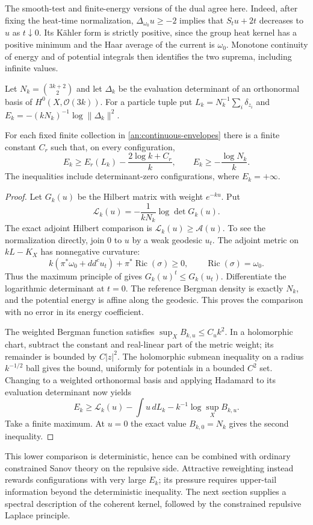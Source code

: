 The smooth-test and finite-energy versions of the dual agree here.
Indeed, after fixing the heat-time normalization,
$\Delta_{\omega_0}u\ge-2$ implies that $S_tu+2t$ decreases to $u$ as
$t\downarrow0$. Its K\"ahler form is strictly positive, since the group
heat kernel has a positive minimum and the Haar average of the current
is $\omega_0$. Monotone continuity of energy and of potential integrals
then identifies the two suprema, including infinite values.

Let $N_k=\binom{3k+2}{2}$ and let $\Delta_k$ be the evaluation
determinant of an orthonormal basis of $H^0(X,\mathcal O(3k))$.
For a particle tuple put $L_k=N_k^{-1}\sum_i\delta_{z_i}$ and
$E_k=-(kN_k)^{-1}\log\|\Delta_k\|^2$.

\begin{theorem}
\label{an:lower-comparison}
For each fixed finite collection in \eqref{an:continuous-envelopes}
there is a finite constant $C_r$ such that, on every configuration,
\begin{equation}
 E_k\ge E_r(L_k)-\frac{2\log k+C_r}{k},
 \qquad E_k\ge-\frac{\log N_k}{k}.
 \label{an:LC}
\end{equation}
The inequalities include determinant-zero configurations, where
$E_k=+\infty$.
\end{theorem}

\begin{proof}
Let $G_k(u)$ be the Hilbert matrix with weight $e^{-ku}$. Put
\[
 \mathcal L_k(u)=-\frac{1}{kN_k}\log\det G_k(u).
\]
The exact adjoint
Hilbert comparison is
$\mathcal L_k(u)\ge\mathcal A(u)$. To see the normalization directly,
join $0$ to $u$ by a weak geodesic $u_t$. The adjoint metric on
$kL-K_X$ has nonnegative curvature:
\[
 k(\pi^*\omega_0+dd^cu_t)+\pi^*\operatorname{Ric}(\sigma)\ge0,
 \qquad\operatorname{Ric}(\sigma)=\omega_0.
\]
Thus the maximum principle of
\citet[Proposition 4.1]{geo_zhang2024} gives
$G_k(u)^t\le G_k(u_t)$. Differentiate the logarithmic determinant at
$t=0$. The reference Bergman density is exactly $N_k$, and the
potential energy is affine along the geodesic. This proves the comparison
with no error in its energy coefficient.

The weighted Bergman function satisfies $\sup_XB_{k,u}\le C_uk^2$.
In a holomorphic chart, subtract the constant and real-linear part of the
metric weight; its remainder is bounded by $C|z|^2$. The holomorphic
submean inequality on a radius $k^{-1/2}$ ball gives the bound, uniformly
for potentials in a bounded $C^2$ set. Changing to a weighted orthonormal
basis and applying Hadamard to its evaluation determinant now yields
\[
 E_k\ge\mathcal L_k(u)-\int u\,dL_k
          -k^{-1}\log\sup_X B_{k,u}.
\]
Take a finite maximum. At $u=0$ the exact value $B_{k,0}=N_k$ gives
the second inequality.
\end{proof}

This lower comparison is deterministic, hence can be combined with
ordinary constrained Sanov theory on the repulsive side. Attractive
reweighting instead rewards configurations with very large $E_k$;
its pressure requires upper-tail information beyond the deterministic
inequality. The next section supplies a spectral description of the
coherent kernel, followed by the constrained repulsive Laplace principle.

